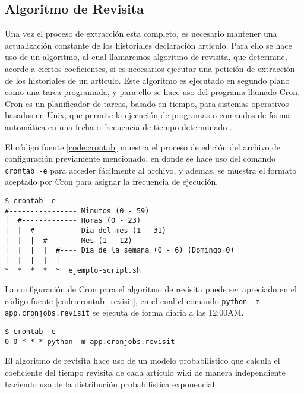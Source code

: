 \subsection{Algoritmo de Revisita}

Una vez el proceso de extracción esta completo,
es necesario mantener una actualización constante de los historiales declaración articulo.
Para ello se hace uso de un algoritmo, al cual llamaremos algoritmo de revisita, que determine, acorde a ciertos coeficientes, si
es necesarios ejecutar una petición de extracción de los historiales de un artículo.
Este algoritmo es ejecutado en segundo plano como una tarea programada, y para ello
se hace uso del programa llamado Cron.
Cron es un planificador de tareas, basado en tiempo, para sistemas operativos basados en Unix, que permite la ejecución de programas o comandos de forma automática en una fecha o frecuencia de tiempo determinado \cite{24}.

El código fuente \ref{code:crontab} muestra el proceso de edición del archivo de configuración previamente mencionado, en donde se hace uso del comando \texttt{crontab -e}
para acceder fácilmente al archivo, y ademas, se muestra el formato aceptado por Cron
para asignar la frecuencia de ejecución.

\begin{lstlisting}[caption={Edición del archivo de configuración de Cron},breaklines=true,label={code:crontab}]
$ crontab -e
#---------------- Minutos (0 - 59)
|  #------------- Horas (0 - 23)
|  |  #---------- Dia del mes (1 - 31)
|  |  |  #------- Mes (1 - 12)
|  |  |  |  #---- Dia de la semana (0 - 6) (Domingo=0)
|  |  |  |  |
*  *  *  *  *  ejemplo-script.sh
\end{lstlisting}

La configuración de Cron para el algoritmo de revisita puede ser apreciado en el código fuente \ref{code:crontab_revisit}, en el cual el comando \texttt{python -m app.cronjobs.revisit} se ejecuta de forma diaria a las 12:00AM.

\begin{lstlisting}[caption={Edición del archivo de configuración de Cron},breaklines=true,label={code:crontab_revisit}]
$ crontab -e
0 0 * * * python -m app.cronjobs.revisit
\end{lstlisting}

El algoritmo de revisita hace uso de un modelo probabilístico que calcula el coeficiente del tiempo revisita de cada artículo wiki de manera independiente haciendo uso de la distribución probabilística exponencial.

